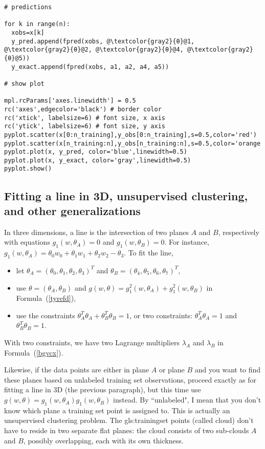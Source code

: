 \documentclass[oneside,10pt]{book}
\begin{document}
\begin{lstlisting}[escapechar=@]
# predictions  

for k in range(n):
  xobs=x[k]
  y_pred.append(fpred(xobs, @\textcolor{gray2}{θ}@1, @\textcolor{gray2}{θ}@2, @\textcolor{gray2}{θ}@4, @\textcolor{gray2}{θ}@5))
  y_exact.append(fpred(xobs, a1, a2, a4, a5)) 

# show plot

mpl.rcParams['axes.linewidth'] = 0.5
rc('axes',edgecolor='black') # border color
rc('xtick', labelsize=6) # font size, x axis 
rc('ytick', labelsize=6) # font size, y axis
pyplot.scatter(x[0:n_training],y_obs[0:n_training],s=0.5,color='red')
pyplot.scatter(x[n_training:n],y_obs[n_training:n],s=0.5,color='orange')
pyplot.plot(x, y_pred, color='blue',linewidth=0.5)
pyplot.plot(x, y_exact, color='gray',linewidth=0.5)
pyplot.show()
\end{lstlisting}

\subsection{Fitting a line in 3D, unsupervised clustering, and other generalizations}

In three dimensions, a line is the intersection of two planes $A$ and $B$, respectively with equations
$g_1(w,\theta_A)=0$ and $g_1(w,\theta_B)=0$. For instance, $g_1(w,\theta_A)=\theta_0 w_0 + \theta_1 w_1 +\theta_2 w_2 
- \theta_3$. To fit the line, \vspace{1ex}
\begin{itemize}
\item let $\theta_A=(\theta_0,\theta_1,\theta_2,\theta_3)^T$ and $\theta_B=(\theta_4,\theta_5,\theta_6,\theta_7)^T$, 
\item use $\theta=(\theta_A,\theta_B)$ and $g(w,\theta)=g_1^2(w,\theta_A)+g_1^2(w,\theta_B)$ in Formula~(\ref{tyrefd}), 
\item use the constraints  $\theta_A^T\theta_A + \theta_B^T\theta_B=1$, or two constraints: $\theta_A^T\theta_A=1$ and $\theta_B^T\theta_B=1$. 
\end{itemize}
 With two constraints, we have two 
Lagrange multipliers $\lambda_A$ and $\lambda_B$ in Formula~(\ref{bgvcx}).

Likewise, if the data points are either in plane $A$ or plane $B$ and you want to find these planes based on unlabeled training set observations, proceed exactly as for fitting a line in 3D (the
 previous paragraph), but this time use $g(w,\theta)=g_1(w,\theta_A)g_1(w,\theta_B)$ instead. By ``unlabeled", I mean that you don't know which plane a training set point is assigned to.   This is actually an unsupervised clustering problem. The \gls{gls:trainingset} points (called cloud) don't have to reside 
 in two separate flat planes: the cloud consists of two sub-clouds $A$ and $B$, possibly overlapping, each with its own thickness.
\end{document}
